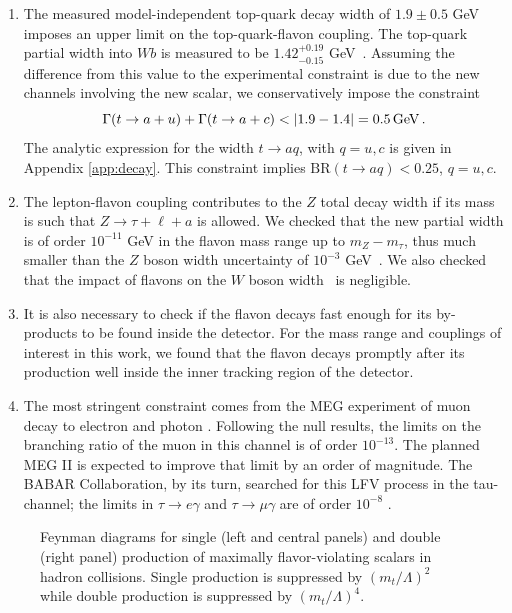 \documentclass[prd,amsfonts,onecolumn,superscriptaddress,aps,nofootinbib,11pt]{revtex4-1}
\begin{document}
\begin{enumerate}
\item The measured model-independent top-quark decay width of $1.9 \pm 0.5$ GeV~\cite{ParticleDataGroup:2022pth} imposes an upper limit on the top-quark-flavon coupling. The top-quark partial width into $Wb$ is measured to be $1.42^{+0.19}_{-0.15}$ GeV~\cite{ParticleDataGroup:2022pth}. Assuming the difference from this value to the experimental constraint is due to the new channels involving the new scalar, we conservatively impose the constraint
\begin{equation}
\Gamma(t\to a+u)+\Gamma(t\to a+c) < |1.9-1.4|=0.5 \, \hbox{GeV}\, . 
\label{eq:br}
\end{equation}
The analytic expression for the width $t \to aq$, with $q = u,c$ is given in Appendix \ref{app:decay}. This constraint implies $\mathrm{BR}(t\to aq)<0.25$, $q=u,c$.

\item The lepton-flavon coupling contributes to the $Z$ total decay width if its mass is such that $Z\to \tau+\ell+a$ is allowed. We checked that the new partial width is of order $10^{-11}$ GeV in the flavon mass range up to $m_Z-m_\tau$, thus much smaller than the $Z$ boson width uncertainty of $10^{-3}$ GeV~\cite{ALEPH:2005ab}. We also checked that the impact of flavons on the $W$ boson width~\cite{ALEPH:2010aa} is negligible.

\item It is also necessary to check if the flavon decays fast enough for its by-products to be found inside the detector. For the mass range and couplings of interest in this work, we found that the flavon decays promptly after its production well inside the inner tracking region of the detector.

\item The most stringent constraint comes from the MEG experiment of muon decay to electron and photon \cite{MEG:2016leq}. Following the null results,  the limits on the branching ratio of the muon in this channel is of order $10^{-13}$. The planned MEG II is expected to improve that limit by an order of magnitude. The BABAR Collaboration, by its turn, searched for this LFV process in the tau-channel; the limits in $\tau \rightarrow e \gamma$ and $\tau \rightarrow \mu\gamma$ are of order $10^{-8}$ \cite{BaBar:2009hkt}. 

\end{enumerate}

\begin{figure}[t]
    \centering
          
    \caption{Feynman diagrams for single (left and central panels) and double (right panel) production of maximally flavor-violating scalars in hadron collisions. Single production is suppressed by $(m_t/\Lambda)^2$ while double production is suppressed by $(m_t/\Lambda)^4$.}
    \label{fig:prod}
\end{figure}
\end{document}
